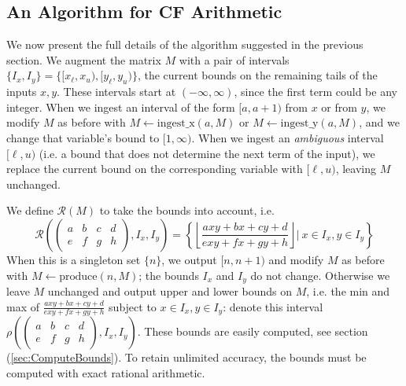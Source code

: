 \documentclass[11pt, oneside]{amsart}   	%
\newcommand{\bihom}[8]{{\frac{#1 xy + #2 x + #3 y + #4}{#5 xy + #6 x + #7 y + #8}}}
\newcommand{\abcd}{\left(
\begin{smallmatrix} 
a & b & c & d\\ 
e & f & g & h
\end{smallmatrix}
\right)}
\begin{document}
\subsection{An Algorithm for CF Arithmetic}\label{sec:finalAlgorithm}
We now present the full details of the algorithm suggested in the previous section.  We augment the matrix $M$ with a pair of intervals
$\{I_x, I_y\} = \{[x_{\ell},x_{u}), [y_{\ell}, y_{u})\}$, the current bounds on the remaining tails of the inputs $x,y$. These
intervals start at $(-\infty, \infty)$, since the first term could be any integer. When we ingest an interval of the form $[a,a+1)$ from
$x$ or from $y$, we modify $M$ as before with $M \leftarrow \mbox{ingest\_x}(a,M)$ or $M \leftarrow \mbox{ingest\_y}(a,M)$,
and we change that variable's bound to $[1, \infty)$. When we ingest an \emph{ambiguous} interval $[\ell, u)$ (i.e. a bound that
does not determine the next term of the input), we replace the current bound on the corresponding variable with $[\ell, u)$, leaving $M$ unchanged. 

We define $\mathcal{R}(M)$ to take the bounds into account, i.e.
\begin{equation}
\mathcal{R}\left(\abcd, I_x, I_y\right) = \left\{ \left\lfloor \bihom{a}{b}{c}{d}{e}{f}{g}{h} \right\rfloor | \  x \in I_x, y \in I_y \right\}
\end{equation}
When this is a singleton set $\{n\}$, we output $[n,n+1)$ and modify $M$ as before with $M \leftarrow \mbox{produce}(n,M)$;
the bounds $I_x$ and $I_y$ do not change. Otherwise we leave $M$ unchanged and output upper and lower bounds on $M$,
i.e. the min and max of $\bihom{a}{b}{c}{d}{e}{f}{g}{h}$ subject to $x \in I_x, y \in I_y$:
denote this interval $\rho\left(\abcd, I_x, I_y\right)$.
These bounds are easily computed, see section (\ref{sec:ComputeBounds}).
To retain unlimited accuracy, the bounds must be computed with exact rational arithmetic.
\end{document}
